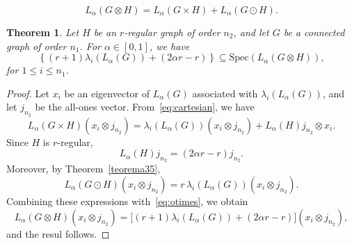 \documentclass[10pt,a4paper]{amsart}
\newtheorem{theorem}{Theorem}
\begin{document}
\begin{equation}\label{eq:otimes}
L_\alpha(G \otimes H)
=
L_\alpha(G \times H) + L_\alpha(G\odot H).
\end{equation}

\begin{theorem}
Let $H$ be an $r$-regular graph of order $n_2$, and let $G$ be a connected graph of order $n_1$. For $\alpha \in [0,1]$, we have
\[
\left\{
(r+1)\lambda_i(L_\alpha(G)) + (2\alpha r - r)
\right\}
\subseteq
\mathrm{Spec}(L_\alpha(G \otimes H)),
\]
for $1 \le i \le n_1.$
\end{theorem}

\begin{proof}
Let $x_i$ be an eigenvector of $L_\alpha(G)$ associated with $\lambda_i(L_\alpha(G))$, and let $j_{n_2}$ be the all-ones vector. From~\eqref{eq:cartesian}, we have
\[
L_\alpha(G \times H)(x_i \otimes j_{n_2})
=
\lambda_i(L_\alpha(G)) (x_i \otimes j_{n_2})
+
L_\alpha(H)j_{n_2} \otimes x_i.
\]
Since $H$ is $r$-regular,
\[
L_\alpha(H)j_{n_2} = (2\alpha r - r)j_{n_2}.
\]
Moreover, by Theorem~\ref{teorema35},
\[
L_\alpha(G \odot H)(x_i \otimes j_{n_2})
=
r\,\lambda_i(L_\alpha(G))(x_i \otimes j_{n_2}).
\]
Combining these expressions with~\eqref{eq:otimes}, we obtain
\[
L_\alpha(G \otimes H)(x_i \otimes j_{n_2})
=
\big[(r+1)\lambda_i(L_\alpha(G)) + (2\alpha r - r)\big](x_i \otimes j_{n_2}),
\]
and the resul follows.
\end{proof}
\end{document}
